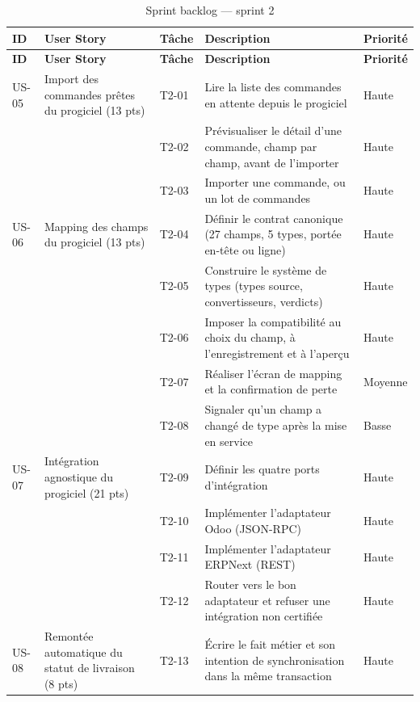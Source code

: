 \begin{small}
\begin{longtable}{L{1.1cm}L{3.0cm}L{1.2cm}L{7.0cm}L{1.3cm}}
\caption{Sprint backlog — sprint 2}\label{tab:backlog-s2}\\
\hline
{}
\textbf{ID} & \textbf{User Story} & \textbf{Tâche} & \textbf{Description} & \textbf{Priorité} \\
\hline
\endfirsthead
\hline
{}
\textbf{ID} & \textbf{User Story} & \textbf{Tâche} & \textbf{Description} & \textbf{Priorité} \\
\hline
\endhead
\hline
\endfoot

US-05 & Import des commandes prêtes du progiciel (13 pts) & T2-01 & Lire la liste des commandes en attente depuis le progiciel & Haute \\
\hline
      &  & T2-02 & Prévisualiser le détail d'une commande, champ par champ, avant de l'importer & Haute \\
\hline
      &  & T2-03 & Importer une commande, ou un lot de commandes & Haute \\
\hline
US-06 & Mapping des champs du progiciel (13 pts) & T2-04 & Définir le contrat canonique (27 champs, 5 types, portée en-tête ou ligne) & Haute \\
\hline
      &  & T2-05 & Construire le système de types (types source, convertisseurs, verdicts) & Haute \\
\hline
      &  & T2-06 & Imposer la compatibilité au choix du champ, à l'enregistrement et à l'aperçu & Haute \\
\hline
      &  & T2-07 & Réaliser l'écran de mapping et la confirmation de perte & Moyenne \\
\hline
      &  & T2-08 & Signaler qu'un champ a changé de type après la mise en service & Basse \\
\hline
US-07 & Intégration agnostique du progiciel (21 pts) & T2-09 & Définir les quatre ports d'intégration & Haute \\
\hline
      &  & T2-10 & Implémenter l'adaptateur Odoo (JSON-RPC) & Haute \\
\hline
      &  & T2-11 & Implémenter l'adaptateur ERPNext (REST) & Haute \\
\hline
      &  & T2-12 & Router vers le bon adaptateur et refuser une intégration non certifiée & Haute \\
\hline
US-08 & Remontée automatique du statut de livraison (8 pts) & T2-13 & Écrire le fait métier et son intention de synchronisation dans la même transaction & Haute \\

\end{longtable}
\end{small}
